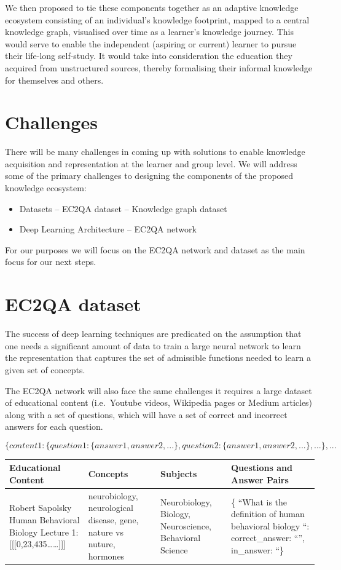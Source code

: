 \documentclass{acm_proc_article-sp}
\providecommand{\tightlist}{%
  \setlength{\itemsep}{0pt}\setlength{\parskip}{0pt}}
\begin{document}
We then proposed to tie these components together as an adaptive
knowledge ecosystem consisting of an individual's knowledge footprint,
mapped to a central knowledge graph, visualised over time as a learner's
knowledge journey. This would serve to enable the independent (aspiring
or current) learner to pursue their life-long self-study. It would take
into consideration the education they acquired from unstructured
sources, thereby formalising their informal knowledge for themselves and
others.

\section{Challenges}\label{challenges}

There will be many challenges in coming up with solutions to enable
knowledge acquisition and representation at the learner and group level.
We will address some of the primary challenges to designing the
components of the proposed knowledge ecosystem:

\begin{itemize}
\tightlist
\item
  Datasets -- EC2QA dataset -- Knowledge graph dataset
\item
  Deep Learning Architecture -- EC2QA network
\end{itemize}

For our purposes we will focus on the EC2QA network and dataset as the
main focus for our next steps.

\section{EC2QA dataset}\label{ec2qa-dataset}

The success of deep learning techniques are predicated on the assumption
that one needs a significant amount of data to train a large neural
network to learn the representation that captures the set of admissible
functions needed to learn a given set of concepts.

The EC2QA network will also face the same challenges it requires a large
dataset of educational content (i.e.~Youtube videos, Wikipedia pages or
Medium articles) along with a set of questions, which will have a set of
correct and incorrect answers for each question.

\[
 \{content1: \{question1: \{answer1, answer2,...\},  question2: \{answer1, answer2,...\},...\},...
\]

\begin{longtable}[]{@{}llll@{}}
\toprule
Educational Content & Concepts & Subjects & Questions and Answer
Pairs\tabularnewline
\midrule
\endhead
Robert Sapolsky Human Behavioral Biology Lecture 1:
{[}{[}{[}0,23,435\ldots{}\ldots{}{]}{]}{]} & neurobiology, neurological
disease, gene, nature vs nuture, hormones & Neurobiology, Biology,
Neuroscience, Behavioral Science & \{ ``What is the definition of human
behavioral biology ``: correct\_answer: ``'', in\_answer:
``\}\tabularnewline
\bottomrule
\end{longtable}
\end{document}
